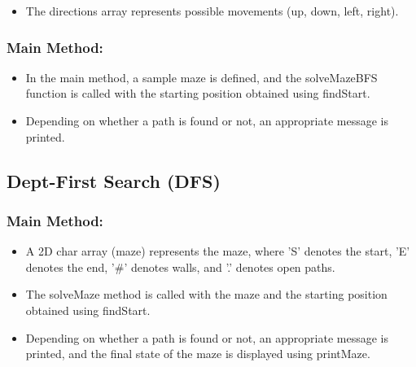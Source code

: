 \documentclass[12pt]{report}
\begin{document}
\begin{itemize}
    \item The directions array represents possible movements (up, down, left, right).
\end{itemize}


\subsubsection{Main Method:}

\begin{itemize}
    \item In the main method, a sample maze is defined, and the solveMazeBFS function is called with the starting position obtained using findStart.
\end{itemize}

\begin{itemize}
    \item Depending on whether a path is found or not, an appropriate message is printed.
\end{itemize}





\subsection{Dept-First Search (DFS)}
\subsubsection{Main Method:}

\begin{itemize}
    \item A 2D char array (maze) represents the maze, where 'S' denotes the start, 'E' denotes the end, '#' denotes walls, and '.' denotes open paths.
\end{itemize}

\begin{itemize}
    \item The solveMaze method is called with the maze and the starting position obtained using findStart.
\end{itemize}

\begin{itemize}
    \item Depending on whether a path is found or not, an appropriate message is printed, and the final state of the maze is displayed using printMaze.
\end{itemize}
\end{document}
